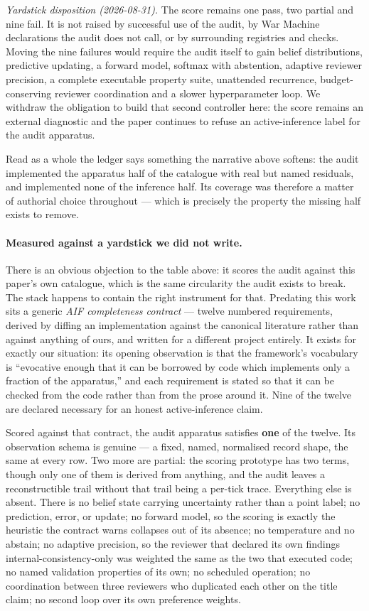 \emph{Yardstick disposition (2026-08-31).}  The score remains one pass, two partial and nine fail.  It is not raised by successful use of the audit, by War Machine declarations the audit does not call, or by surrounding registries and checks.  Moving the nine failures would require the audit itself to gain belief distributions, predictive updating, a forward model, softmax with abstention, adaptive reviewer precision, a complete executable property suite, unattended recurrence, budget-conserving reviewer coordination and a slower hyperparameter loop.  We withdraw the obligation to build that second controller here: the score remains an external diagnostic and the paper continues to refuse an active-inference label for the audit apparatus.

Read as a whole the ledger says something the narrative above softens: the
audit implemented the apparatus half of the catalogue with real but named
residuals, and implemented none of the inference half.  Its coverage was
therefore a matter of authorial choice throughout --- which is precisely the
property the missing half exists to remove.

\paragraph{Measured against a yardstick we did not write.}  There is an obvious
objection to the table above: it scores the audit against this paper's own
catalogue, which is the same circularity the audit exists to break.  The stack
happens to contain the right instrument for that.  Predating this work sits a
generic \emph{AIF completeness contract} --- twelve numbered requirements,
derived by diffing an implementation against the canonical literature rather
than against anything of ours, and written for a different project entirely.  It
exists for exactly our situation: its opening observation is that the
framework's vocabulary is ``evocative enough that it can be borrowed by code
which implements only a fraction of the apparatus,'' and each requirement is
stated so that it can be checked from the code rather than from the prose around
it.  Nine of the twelve are declared necessary for an honest active-inference
claim.

Scored against that contract, the audit apparatus satisfies \textbf{one} of the
twelve.  Its observation schema is genuine --- a fixed, named, normalised record
shape, the same at every row.  Two more are partial: the scoring prototype has
two terms, though only one of them is derived from anything, and the audit
leaves a reconstructible trail without that trail being a per-tick trace.
Everything else is absent.  There is no belief state carrying uncertainty rather
than a point label; no prediction, error, or update; no forward model, so the
scoring is exactly the heuristic the contract warns collapses out of its
absence; no temperature and no abstain; no adaptive precision, so the reviewer
that declared its own findings internal-consistency-only was weighted the same
as the two that executed code; no named validation properties of its own; no
scheduled operation; no coordination between three reviewers who duplicated each
other on the title claim; no second loop over its own preference weights.

